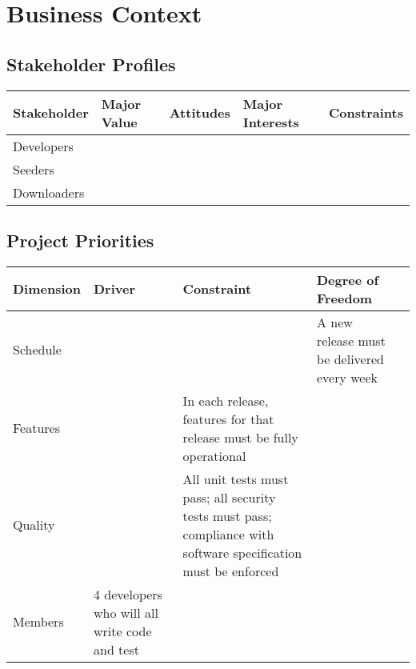 \documentclass[letter]{scrartcl}
\begin{document}


\section{Business Context}
\subsection{Stakeholder Profiles}
\begin{tabular}{| l | l | l | l | l |}
\hline
\textbf{Stakeholder} & \textbf{Major Value} & \textbf{Attitudes} & \textbf{Major Interests} & {Constraints} \\
\hline
\hline
Developers  & & & & \\
Seeders     & & & & \\ 
Downloaders & & & & \\
\end{tabular}

\subsection{Project Priorities}
\begin{tabular}{| l | l | l | l | l |}
\hline
\textbf{Dimension} & \textbf{Driver} & \textbf{Constraint} & \textbf{Degree of Freedom} \\
\hline
\hline
Schedule & & & A new release must be delivered every week \\
\hline
Features & & In each release, features for that release must be fully operational & \\
\hline
Quality  & & All unit tests must pass; all security tests must pass; compliance with software specification must be enforced & \\
\hline
Members  & 4 developers who will all write code and test & & \\
\end{tabular}
\end{document}
